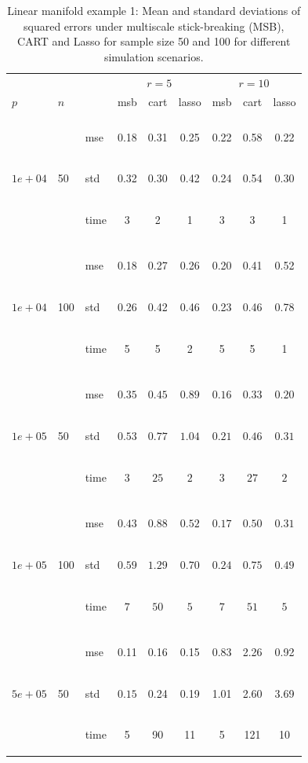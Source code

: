 \documentclass{article} %
\newcommand{\efoo}{\end{footnotesize}}
\newcommand{\bfoo}{\begin{footnotesize}}
\begin{document}
\begin{table}[t]
\caption{Linear manifold example 1: Mean and standard deviations of squared errors under multiscale stick-breaking (MSB), CART and Lasso for sample size 50 and 100 for different simulation scenarios.}\label{table:linear1}
\vskip 0.15in
\begin{center}
\begin{small}
\begin{sc}
\begin{tabular}{lllcccccc}
\hline
&&&\multicolumn{3}{c}{$r=5$}&\multicolumn{3}{c}{$r=10$}\\
$p$&$n$& & msb&cart&lasso & msb&cart&lasso \\
\\
\multirow{3}{*}{$1e+04$}&\multirow{3}{*}{50}&\bfoo mse\efoo&0.18&0.31&0.25&0.22&0.58&0.22\\
&&\bfoo std\efoo &0.32&0.30&0.42&0.24&0.54&0.30\\
&&\bfoo time\efoo &3&2&1&3&3&1\\

\\
\multirow{3}{*}{$1e+04$}&\multirow{3}{*}{100}&\bfoo mse\efoo&0.18&0.27&0.26&0.20&0.41&0.52\\
&&\bfoo std\efoo & 0.26&0.42&0.46&0.23&0.46&0.78\\
&&\bfoo time\efoo &5&5& 2&5&5&1\\

\\
\multirow{3}{*}{$1e+05$}&\multirow{3}{*}{50}&\bfoo mse\efoo&$0.35$&$0.45$&$0.89$&$0.16$&$0.33$&$0.20$\\
&&\bfoo std\efoo &$0.53$ &$0.77$&$1.04$&$0.21$&$0.46$&$0.31$\\
&&\bfoo time\efoo &$3$&$25$&$2$&$3$&$27$&$2$\\
\\
\multirow{3}{*}{$1e+05$}&\multirow{3}{*}{100}&\bfoo mse\efoo&$0.43$&$0.88$&$0.52$&$0.17$&$0.50$&$0.31$\\
&&\bfoo std\efoo &$0.59$ &$1.29$&$0.70$&$0.24$ &$0.75$&$0.49$\\
&&\bfoo time\efoo &$7$&$50$&$5$&$7$&$51$&$5$\\
\\
\multirow{3}{*}{$5e+05$}&\multirow{3}{*}{50}&\bfoo mse\efoo&0.11&0.16&0.15&0.83&2.26&0.92\\
&&\bfoo std\efoo&$0.15$ &0.24&0.19&1.01&2.60&3.69\\
&&\bfoo time\efoo &5&90&11&5&121&10\\



\end{tabular}
\end{sc}
\end{small}
\end{center}
\end{table}
\end{document}
